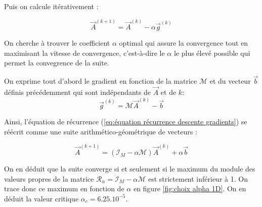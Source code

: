 \documentclass{article}
\begin{document}
Puis on calcule itérativement :

\begin{equation}
    \Vec{A}^{(k+1)} = \Vec{A}^{(k)} - \alpha\Vec{g}^{(k)} 
\label{eq:équation récurrence descente gradients}
\end{equation}

On cherche à trouver le coefficient $\alpha$ optimal qui assure la convergence tout en maximisant la vitesse de convergence, 
c'est-à-dire le $\alpha$ le plus élevé possible qui permet la convegrence de la suite.

On exprime tout d'abord le gradient en fonction de la matrice $\mathcal{M}$ et du vecteur $\vec{b}$ définis précédemment qui sont indépendants de $\vec{A}$ et de $k$:
\begin{equation}
    \Vec{g}^{(k)} = \mathcal{M}\Vec{A}^{(k)} - \vec{b}
\label{eq:expression matricielle gradient}
\end{equation}

Ainsi, l'équation de récurrence (\ref{eq:équation récurrence descente gradients}) se réécrit comme une suite arithmético-géométrique de vecteurs :

\begin{equation}
    \Vec{A}^{(k+1)} = (\mathcal{I}_M - \alpha \mathcal{M} )  \Vec{A}^{(k)} + \alpha\Vec{b}
\label{eq:équation récurrence descente gradients v2}
\end{equation}

On en déduit que la suite converge si et seulement si le maximum du module des valeurs propres de la matrice
$\mathcal{R}_\alpha = \mathcal{I}_M - \alpha \mathcal{M}$ est strictement inférieur à 1.
On trace donc ce maximum en fonction de $\alpha$ en figure \ref{fig:choix alpha 1D}. 
On en déduit la valeur critique $\alpha_c = 6.25.10^{-5}$.
\end{document}
